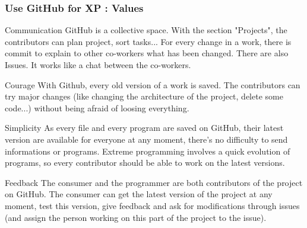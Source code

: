\begin{frame}
    \frametitle{Use GitHub for XP : Values}
    \begin{block}{Communication}
        GitHub is a collective space. With the section "Projects", the contributors can plan project, sort tasks... For every change in a work, there is commit to explain to other co-workers what has been changed. There are also Issues. It works like a chat between the co-workers.
    \end{block}\pause 
    \begin{block}{Courage} 
        With Github, every old version of a work is saved. The contributors can try major changes (like changing the architecture of the project, delete some code...) without being afraid of loosing everything.
    \end{block}
\end{frame}
\begin{frame}
    \begin{block}{Simplicity} 
        As every file and every program are saved on GitHub, their latest version are available for everyone at any moment, there's no difficulty to send informations or programs. Extreme programming involves a quick evolution of programs, so every contributor should be able to work on the latest versions.
    \end{block}\pause
    \begin{block}{Feedback} 
        The consumer and the programmer are both contributors of the project on GitHub. The consumer can get the latest version of the project at any moment, test this version, give feedback and ask for modifications through issues (and assign the person working on this part of the project to the issue).
    \end{block}
\end{frame}
